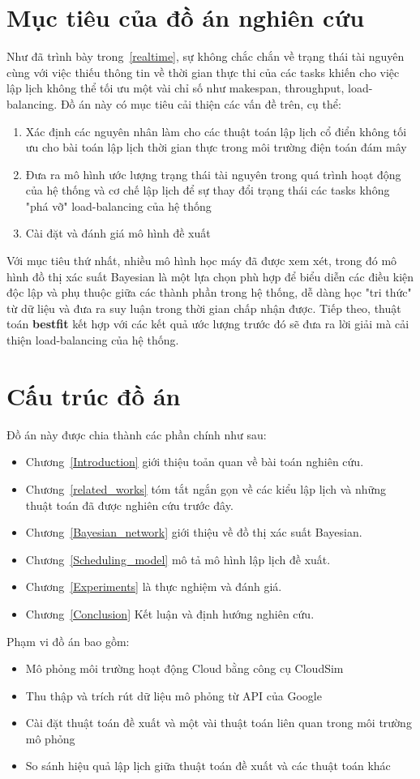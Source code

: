 \documentclass{my_style}
\begin{document}
\section{Mục tiêu của đồ án nghiên cứu}
Như đã trình bày trong~\ref{realtime}, sự không chắc chắn về trạng thái tài nguyên cùng với việc thiếu thông tin về thời gian thực thi của các tasks khiến cho việc lập lịch không thể tối ưu một vài chỉ số như makespan, throughput, load-balancing. Đồ án này có mục tiêu cải thiện các vấn đề trên, cụ thể: 
\begin{enumerate}
	\item Xác định các nguyên nhân làm cho các thuật toán lập lịch cổ điển không tối ưu cho bài toán lập lịch thời gian thực trong môi trường điện toán đám mây 
	\item Đưa ra mô hình ước lượng trạng thái tài nguyên trong quá trình hoạt động của hệ thống và cơ chế lập lịch để sự thay đổi trạng thái các tasks không "phá vỡ" load-balancing của hệ thống
	\item Cài đặt và đánh giá mô hình đề xuất 
\end{enumerate}
Với mục tiêu thứ nhất, nhiều mô hình học máy đã được xem xét, trong đó mô hình đồ thị xác suất Bayesian là một lựa chọn phù hợp để biểu diễn các điều kiện độc lập và phụ thuộc giữa các thành phần trong hệ thống, dễ dàng học "tri thức" từ dữ liệu và đưa ra suy luận trong thời gian chấp nhận được. Tiếp theo, thuật toán \textbf{bestfit} kết hợp với các kết quả ước lượng trước đó sẽ đưa ra lời giải mà cải thiện load-balancing của hệ thống. 
\section{Cấu trúc đồ án}
Đồ án này được chia thành các phần chính như sau: 
\begin{itemize}
	\item Chương~\ref{Introduction} giới thiệu toản quan về bài toán nghiên cứu.
	\item Chương~\ref{related_works} tóm tắt ngắn gọn về các kiểu lập lịch và những thuật toán đã được nghiên cứu trước đây.
	\item Chương~\ref{Bayesian_network} giới thiệu về đồ thị xác suất Bayesian.
	\item Chương~\ref{Scheduling_model} mô tả mô hình lập lịch đề xuất.
	\item Chương~\ref{Experiments} là thực nghiệm và đánh giá. 
	\item Chương~\ref{Conclusion} Kết luận và định hướng nghiên cứu. 
\end{itemize}
Phạm vi đồ án bao gồm: 
\begin{itemize}
	\item Mô phỏng môi trường hoạt động Cloud bằng công cụ CloudSim~\cite{30}
	\item Thu thập và trích rút dữ liệu mô phỏng từ API của Google 
	\item Cài đặt thuật toán đề xuất và một vài thuật toán liên quan trong môi trường mô phỏng 
	\item So sánh hiệu quả lập lịch giữa thuật toán đề xuất và các thuật toán khác 
\end{itemize}
\end{document}
